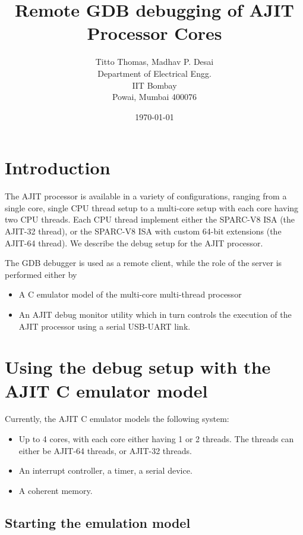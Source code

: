 \documentclass[a4paper, 11pt]{article}
\title{Remote GDB debugging of AJIT Processor Cores}
\author{Titto Thomas, Madhav P. Desai\\ Department of Electrical Engg.\\ IIT Bombay\\Powai, Mumbai 400076}
\date{\today}
\begin{document}
\maketitle

\section{Introduction}

The AJIT processor is available in a variety of configurations, ranging from
a single core, single CPU thread setup to a multi-core setup with each core
having two CPU threads.    Each CPU thread implement either the SPARC-V8 ISA (the AJIT-32 thread), or
the SPARC-V8 ISA with custom  64-bit extensions (the AJIT-64 thread).  We describe the
debug setup for the AJIT processor.

The  GDB debugger is used as a remote client, while the role of the
server is performed either by 
\begin{itemize}
	\item A C emulator model of the multi-core multi-thread processor
	\item An AJIT debug monitor utility which in turn controls the execution
		of the AJIT processor using a serial USB-UART link.
\end{itemize}


\section{Using the debug setup with the AJIT C emulator model}

Currently, the AJIT C emulator models the following system:
\begin{itemize}
\item Up to 4 cores, with each core either having 1 or 2 threads.  
The threads can either be AJIT-64 threads, or AJIT-32 threads.
\item An interrupt controller, a timer, a serial device.
\item A coherent memory.
\end{itemize}

\subsection{Starting the emulation model}
\end{document}
